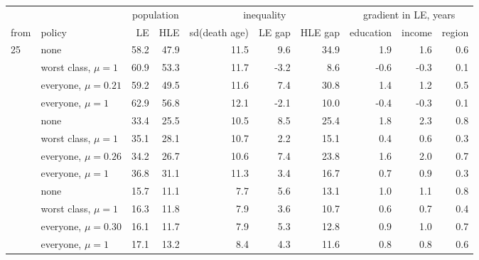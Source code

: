 \begin{tabular}{llrrrrrrrr}
\toprule
 & & \multicolumn{2}{c}{population} & \multicolumn{3}{c}{inequality} & \multicolumn{3}{c}{gradient in LE, years} \\
\cmidrule(lr){3-4} \cmidrule(lr){5-7} \cmidrule(lr){8-10}
from & policy & LE & HLE & sd(death age) & LE gap & HLE gap & education & income & region \\
\midrule
25 & none & 58.2 & 47.9 & 11.5 & 9.6 & 34.9 & 1.9 & 1.6 & 0.6 \\
 & worst class, $\mu=1$ & 60.9 & 53.3 & 11.7 & -3.2 & 8.6 & -0.6 & -0.3 & 0.1 \\
 & everyone, $\mu=0.21$ & 59.2 & 49.5 & 11.6 & 7.4 & 30.8 & 1.4 & 1.2 & 0.5 \\
 & everyone, $\mu=1$ & 62.9 & 56.8 & 12.1 & -2.1 & 10.0 & -0.4 & -0.3 & 0.1 \\
\addlinespace
50 & none & 33.4 & 25.5 & 10.5 & 8.5 & 25.4 & 1.8 & 2.3 & 0.8 \\
 & worst class, $\mu=1$ & 35.1 & 28.1 & 10.7 & 2.2 & 15.1 & 0.4 & 0.6 & 0.3 \\
 & everyone, $\mu=0.26$ & 34.2 & 26.7 & 10.6 & 7.4 & 23.8 & 1.6 & 2.0 & 0.7 \\
 & everyone, $\mu=1$ & 36.8 & 31.1 & 11.3 & 3.4 & 16.7 & 0.7 & 0.9 & 0.3 \\
\addlinespace
70 & none & 15.7 & 11.1 & 7.7 & 5.6 & 13.1 & 1.0 & 1.1 & 0.8 \\
 & worst class, $\mu=1$ & 16.3 & 11.8 & 7.9 & 3.6 & 10.7 & 0.6 & 0.7 & 0.4 \\
 & everyone, $\mu=0.30$ & 16.1 & 11.7 & 7.9 & 5.3 & 12.8 & 0.9 & 1.0 & 0.7 \\
 & everyone, $\mu=1$ & 17.1 & 13.2 & 8.4 & 4.3 & 11.6 & 0.8 & 0.8 & 0.6 \\
\bottomrule
\end{tabular}
